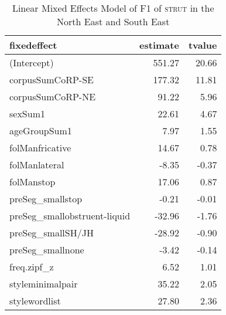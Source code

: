 \begin{table}[ht]
\centering
\begin{tabular}{lrr}
  \hline
fixedeffect & estimate & tvalue \\ 
  \hline
(Intercept) & 551.27 & 20.66 \\ 
  corpusSumCoRP-SE & 177.32 & 11.81 \\ 
  corpusSumCoRP-NE & 91.22 & 5.96 \\ 
  sexSum1 & 22.61 & 4.67 \\ 
  ageGroupSum1 & 7.97 & 1.55 \\ 
  folManfricative & 14.67 & 0.78 \\ 
  folManlateral & -8.35 & -0.37 \\ 
  folManstop & 17.06 & 0.87 \\ 
  preSeg\_smallstop & -0.21 & -0.01 \\ 
  preSeg\_smallobstruent-liquid & -32.96 & -1.76 \\ 
  preSeg\_smallSH/JH & -28.92 & -0.90 \\ 
  preSeg\_smallnone & -3.42 & -0.14 \\ 
  freq.zipf\_z & 6.52 & 1.01 \\ 
  styleminimalpair & 35.22 & 2.05 \\ 
  stylewordlist & 27.80 & 2.36 \\ 
   \hline
\end{tabular}
\caption{Linear Mixed Effects Model of F1 of \textsc{strut} in the North East and South East \label{tbl:SF1NE}} 
\end{table}
